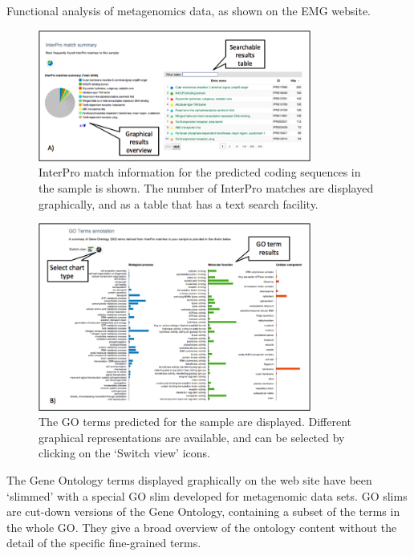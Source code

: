 Functional analysis of metagenomics data, as shown on the EMG website.

\begin{figure}[Figure 4]
\centering
\includegraphics[width=0.8\textwidth]{handout/FA_Interpro.png}
\caption{ InterPro match information for the predicted coding sequences in the sample is shown. The number of InterPro matches are displayed graphically, and as a table that has a text search facility.}
\label{fig:FA_Interpro}
\end{figure}

\begin{figure}[Figure 5]
\centering
\includegraphics[width=0.8\textwidth]{handout/FA_GO.png}
\caption{ The GO terms predicted for the sample are displayed. Different graphical representations are available, and can be selected by clicking on the ‘Switch view’ icons.}
\label{fig:FA_GO}
\end{figure}

The Gene Ontology terms displayed graphically on the web site have been ‘slimmed’ with a special GO slim developed for metagenomic data sets. GO slims are cut-down versions of the Gene Ontology, containing a subset of the terms in the whole GO. They give a broad overview of the ontology content without the detail of the specific fine-grained terms.

